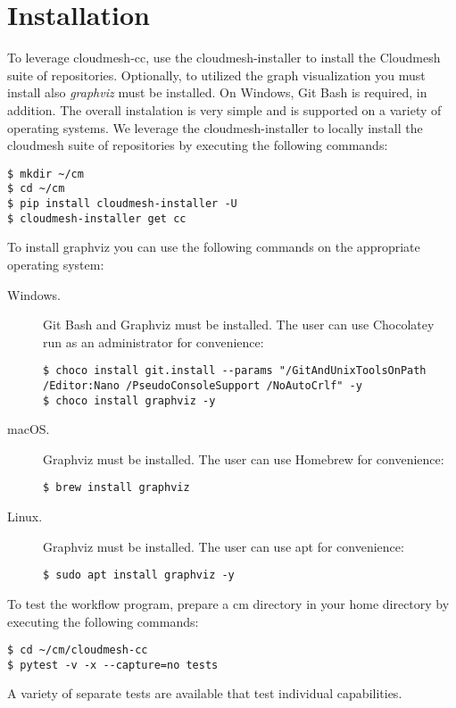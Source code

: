 
\section{Installation}\label{installation}

To leverage cloudmesh-cc, use the cloudmesh-installer to install the
Cloudmesh suite of repositories. Optionally, to utilized the graph
visualization you must install also {\em graphviz} must be
installed. On Windows, Git Bash is required, in addition.  The overall
instalation is very simple and is supported on a variety of operating
systems.  We leverage the cloudmesh-installer to locally install the
cloudmesh suite of repositories by executing the following commands:

\begin{verbatim}
$ mkdir ~/cm
$ cd ~/cm
$ pip install cloudmesh-installer -U
$ cloudmesh-installer get cc
\end{verbatim}

To install graphviz you can use the following commands on the appropriate operating system:

\begin{description}

\item[Windows.]
Git Bash and Graphviz must be installed. The user can use Chocolatey run
as an administrator for convenience:

\begin{verbatim}
$ choco install git.install --params "/GitAndUnixToolsOnPath /Editor:Nano /PseudoConsoleSupport /NoAutoCrlf" -y
$ choco install graphviz -y
\end{verbatim}

\item[macOS.] Graphviz must be installed. The user can use Homebrew for convenience:

\begin{verbatim}
$ brew install graphviz
\end{verbatim}

\item[Linux.] Graphviz must be installed. The user can use apt for convenience:

\begin{verbatim}
$ sudo apt install graphviz -y
\end{verbatim}

\end{description}

To test the workflow program, prepare a cm directory in your home
directory by executing the following commands:

\begin{verbatim}
$ cd ~/cm/cloudmesh-cc
$ pytest -v -x --capture=no tests
\end{verbatim}

A variety of separate tests are available that test individual capabilities. 
